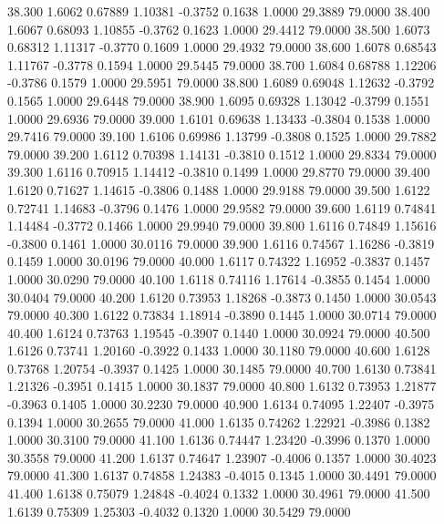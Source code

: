   38.300   1.6062   0.67889   1.10381  -0.3752   0.1638   1.0000  29.3889  79.0000
  38.400   1.6067   0.68093   1.10855  -0.3762   0.1623   1.0000  29.4412  79.0000
  38.500   1.6073   0.68312   1.11317  -0.3770   0.1609   1.0000  29.4932  79.0000
  38.600   1.6078   0.68543   1.11767  -0.3778   0.1594   1.0000  29.5445  79.0000
  38.700   1.6084   0.68788   1.12206  -0.3786   0.1579   1.0000  29.5951  79.0000
  38.800   1.6089   0.69048   1.12632  -0.3792   0.1565   1.0000  29.6448  79.0000
  38.900   1.6095   0.69328   1.13042  -0.3799   0.1551   1.0000  29.6936  79.0000
  39.000   1.6101   0.69638   1.13433  -0.3804   0.1538   1.0000  29.7416  79.0000
  39.100   1.6106   0.69986   1.13799  -0.3808   0.1525   1.0000  29.7882  79.0000
  39.200   1.6112   0.70398   1.14131  -0.3810   0.1512   1.0000  29.8334  79.0000
  39.300   1.6116   0.70915   1.14412  -0.3810   0.1499   1.0000  29.8770  79.0000
  39.400   1.6120   0.71627   1.14615  -0.3806   0.1488   1.0000  29.9188  79.0000
  39.500   1.6122   0.72741   1.14683  -0.3796   0.1476   1.0000  29.9582  79.0000
  39.600   1.6119   0.74841   1.14484  -0.3772   0.1466   1.0000  29.9940  79.0000
  39.800   1.6116   0.74849   1.15616  -0.3800   0.1461   1.0000  30.0116  79.0000
  39.900   1.6116   0.74567   1.16286  -0.3819   0.1459   1.0000  30.0196  79.0000
  40.000   1.6117   0.74322   1.16952  -0.3837   0.1457   1.0000  30.0290  79.0000
  40.100   1.6118   0.74116   1.17614  -0.3855   0.1454   1.0000  30.0404  79.0000
  40.200   1.6120   0.73953   1.18268  -0.3873   0.1450   1.0000  30.0543  79.0000
  40.300   1.6122   0.73834   1.18914  -0.3890   0.1445   1.0000  30.0714  79.0000
  40.400   1.6124   0.73763   1.19545  -0.3907   0.1440   1.0000  30.0924  79.0000
  40.500   1.6126   0.73741   1.20160  -0.3922   0.1433   1.0000  30.1180  79.0000
  40.600   1.6128   0.73768   1.20754  -0.3937   0.1425   1.0000  30.1485  79.0000
  40.700   1.6130   0.73841   1.21326  -0.3951   0.1415   1.0000  30.1837  79.0000
  40.800   1.6132   0.73953   1.21877  -0.3963   0.1405   1.0000  30.2230  79.0000
  40.900   1.6134   0.74095   1.22407  -0.3975   0.1394   1.0000  30.2655  79.0000
  41.000   1.6135   0.74262   1.22921  -0.3986   0.1382   1.0000  30.3100  79.0000
  41.100   1.6136   0.74447   1.23420  -0.3996   0.1370   1.0000  30.3558  79.0000
  41.200   1.6137   0.74647   1.23907  -0.4006   0.1357   1.0000  30.4023  79.0000
  41.300   1.6137   0.74858   1.24383  -0.4015   0.1345   1.0000  30.4491  79.0000
  41.400   1.6138   0.75079   1.24848  -0.4024   0.1332   1.0000  30.4961  79.0000
  41.500   1.6139   0.75309   1.25303  -0.4032   0.1320   1.0000  30.5429  79.0000
